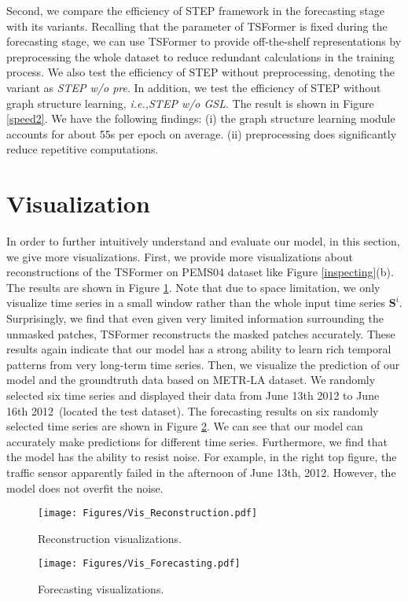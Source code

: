 \documentclass[sigconf]{acmart}
\newcommand{\ie}{\textit{i.e.,}\xspace}
\begin{document}
Second, we compare the efficiency of STEP framework in the forecasting stage with its variants.
Recalling that the parameter of TSFormer is fixed during the forecasting stage, we can use TSFormer to provide off-the-shelf representations by preprocessing the whole dataset to reduce redundant calculations in the training process.
We also test the efficiency of STEP without preprocessing, denoting the variant as \textit{STEP w/o pre}.
In addition, we test the efficiency of STEP without graph structure learning, \ie \textit{STEP w/o GSL}.
The result is shown in Figure \ref{speed2}.
We have the following findings: 
(i) the graph structure learning module accounts for about 55s per epoch on average.
(ii) preprocessing does significantly reduce repetitive computations.







 
\section{Visualization}
\label{appendix_visualization}
In order to further intuitively understand and evaluate our model, in this section, we give more visualizations.
First, we provide more visualizations about reconstructions of the TSFormer on PEMS04 dataset like Figure \ref{inspecting}(b).
The results are shown in Figure \ref{vis_rec}. 
Note that due to space limitation, we only visualize time series in a small window rather than the whole input time series $\mathbf{S}^i$.
Surprisingly, we find that even given very limited information surrounding the unmasked patches, TSFormer reconstructs the masked patches accurately.
These results again indicate that our model has a strong ability to learn rich temporal patterns from very long-term time series.
Then, we visualize the prediction of our model and the groundtruth data based on METR-LA dataset.
We randomly selected six time series and displayed their data from June 13th 2012 to June 16th 2012~(located the test dataset).
The forecasting results on six randomly selected time series are shown in Figure \ref{vis_for}.
We can see that our model can accurately make predictions for different time series.
Furthermore, we find that the model has the ability to resist noise. 
For example, in the right top figure, the traffic sensor apparently failed in the afternoon of June 13th, 2012. 
However, the model does not overfit the noise.






\begin{figure}[ht]
\centering
  \texttt{[image: Figures/Vis\_Reconstruction.pdf]}
  \caption{Reconstruction visualizations.}
  \label{vis_rec}
\end{figure}

\begin{figure}[ht]
  \centering
  \texttt{[image: Figures/Vis\_Forecasting.pdf]}
  \caption{Forecasting visualizations.}
  \label{vis_for}
\end{figure} 
\end{document}

